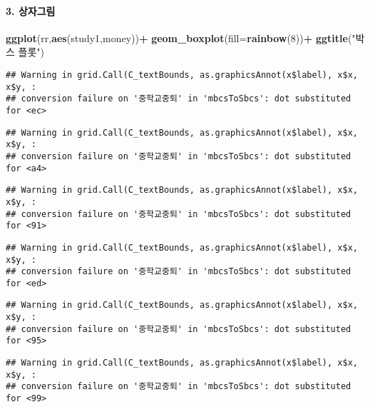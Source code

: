 \documentclass[
]{article}
\newenvironment{Shaded}{\begin{snugshade}}{\end{snugshade}}
\newcommand{\AttributeTok}[1]{\textcolor[rgb]{0.13,0.29,0.53}{#1}}
\newcommand{\DecValTok}[1]{\textcolor[rgb]{0.00,0.00,0.81}{#1}}
\newcommand{\FunctionTok}[1]{\textcolor[rgb]{0.13,0.29,0.53}{\textbf{#1}}}
\newcommand{\NormalTok}[1]{#1}
\newcommand{\SpecialCharTok}[1]{\textcolor[rgb]{0.81,0.36,0.00}{\textbf{#1}}}
\newcommand{\StringTok}[1]{\textcolor[rgb]{0.31,0.60,0.02}{#1}}
\begin{document}
\hypertarget{uxc0c1uxc790uxadf8uxb9bc}{%
\paragraph{3. 상자그림}\label{uxc0c1uxc790uxadf8uxb9bc}}

\begin{Shaded}
\begin{Highlighting}[]
\FunctionTok{ggplot}\NormalTok{(rr,}\FunctionTok{aes}\NormalTok{(study1,money))}\SpecialCharTok{+}
    \FunctionTok{geom\_boxplot}\NormalTok{(}\AttributeTok{fill=}\FunctionTok{rainbow}\NormalTok{(}\DecValTok{8}\NormalTok{))}\SpecialCharTok{+}
    \FunctionTok{ggtitle}\NormalTok{(}\StringTok{"박스 플롯"}\NormalTok{)}
\end{Highlighting}
\end{Shaded}

\begin{verbatim}
## Warning in grid.Call(C_textBounds, as.graphicsAnnot(x$label), x$x, x$y, :
## conversion failure on '중학교중퇴' in 'mbcsToSbcs': dot substituted for <ec>
\end{verbatim}

\begin{verbatim}
## Warning in grid.Call(C_textBounds, as.graphicsAnnot(x$label), x$x, x$y, :
## conversion failure on '중학교중퇴' in 'mbcsToSbcs': dot substituted for <a4>
\end{verbatim}

\begin{verbatim}
## Warning in grid.Call(C_textBounds, as.graphicsAnnot(x$label), x$x, x$y, :
## conversion failure on '중학교중퇴' in 'mbcsToSbcs': dot substituted for <91>
\end{verbatim}

\begin{verbatim}
## Warning in grid.Call(C_textBounds, as.graphicsAnnot(x$label), x$x, x$y, :
## conversion failure on '중학교중퇴' in 'mbcsToSbcs': dot substituted for <ed>
\end{verbatim}

\begin{verbatim}
## Warning in grid.Call(C_textBounds, as.graphicsAnnot(x$label), x$x, x$y, :
## conversion failure on '중학교중퇴' in 'mbcsToSbcs': dot substituted for <95>
\end{verbatim}

\begin{verbatim}
## Warning in grid.Call(C_textBounds, as.graphicsAnnot(x$label), x$x, x$y, :
## conversion failure on '중학교중퇴' in 'mbcsToSbcs': dot substituted for <99>
\end{verbatim}
\end{document}
